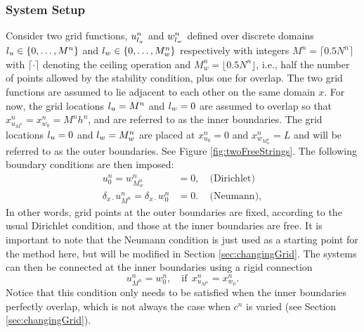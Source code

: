 \subsubsection{System Setup}\label{sec:systSetup}
Consider two grid functions, $u_{l_u}^n$ and $w_{l_w}^n$ defined over discrete domains ${l_u} \in \{0, \hdots, M^n\}$ and ${l_w} \in \{0, \hdots, M_w^n\}$ respectively with integers $M^n = \lceil 0.5N^n\rceil $ with $\lceil \cdot \rceil$ denoting the ceiling operation and $M_w^n = \lfloor 0.5N^n\rfloor$, i.e., half the number of points allowed by the stability condition, plus one for overlap. The two grid functions are assumed to lie adjacent to each other on the same domain $x$. For now, the grid locations ${l_u} = M^n$ and ${l_w} = 0$ are assumed to overlap so that $x_{u_{M^n}}^n = x_{w_0}^n = M^nh^n$, and are referred to as the inner boundaries. The grid locations ${l_u} = 0$ and ${l_w} = M_w^n$ are placed at $x_{u_0}^n = 0$ and $x_{w_{M_w^n}}^n = L$ and will be referred to as the outer boundaries. See Figure \ref{fig:twoFreeStrings}. The following boundary conditions are then imposed:
\begin{subequations}\label{eq:halfStringBoundaryCond}
    \begin{align}
        u_0^n = w_{M_w^n}^n &= 0,\quad \text{(Dirichlet)}\label{eq:halfStringBoundaryCondDirichlet}\\
        \delta_{x\cdot}u_{M^n}^n = \delta_{x\cdot}w_0^n &= 0.\, \quad\text{(Neumann)}, \label{eq:halfStringBoundaryCondNeumann}
    \end{align}
\end{subequations}
In other words, grid points at the outer boundaries are fixed, according to the usual Dirichlet condition, and those at the inner boundaries are free. It is important to note that the Neumann condition is just used as a starting point for the method here, but will be modified in Section \ref{sec:changingGrid}.
%
%
The systems can then be connected at the inner boundaries using a rigid connection
\begin{equation}\label{eq:rigid}
    u_{M^n}^n = w_0^n, \quad \text{if}\ \ x_{u_{M^n}}^n = x_{w_0}^n.
\end{equation}
Notice that this condition only needs to be satisfied when the inner boundaries perfectly overlap, which is not always the case when $c^n$ is varied (see Section \ref{sec:changingGrid}).

